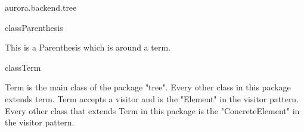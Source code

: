 \begin{texdocpackage}{aurora.backend.tree}
\begin{texdocclass}{class}{Parenthesis}
\label{texdoclet:aurora.backend.tree.Parenthesis}
\begin{texdocclassintro}
This is a Parenthesis which is around a term.\end{texdocclassintro}
\begin{texdocclassconstructors}
\end{texdocclassconstructors}
\begin{texdocclassmethods}
\end{texdocclassmethods}
\end{texdocclass}


\begin{texdocclass}{class}{Term}
\label{texdoclet:aurora.backend.tree.Term}
\begin{texdocclassintro}
Term is the main class of the package "tree". Every other class in this package extends term.
 Term accepts a visitor and is the "Element" in the visitor pattern.
 Every other class that extends Term in this package is the "ConcreteElement" in the visitor pattern.\end{texdocclassintro}
\begin{texdocclassconstructors}
\end{texdocclassconstructors}
\begin{texdocclassmethods}
\end{texdocclassmethods}
\end{texdocclass}


\end{texdocpackage}



